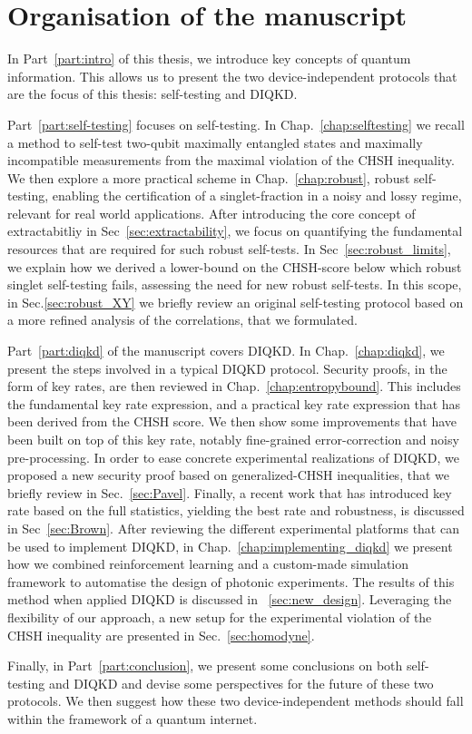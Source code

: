 \chapter{Organisation of the manuscript}

In Part~\ref{part:intro} of this thesis, we introduce key concepts of quantum information.
This allows us to present the two device-independent protocols that are the focus of this thesis: self-testing and \acrfull{DIQKD}.

\medbreak

Part~\ref{part:self-testing} focuses on self-testing.
In Chap.~\ref{chap:selftesting} we recall a method to self-test two-qubit maximally entangled states and maximally incompatible measurements from the maximal violation of the CHSH inequality.
We then explore a more practical scheme in Chap.~\ref{chap:robust}, robust self-testing, enabling the certification of a singlet-fraction in a noisy and lossy regime, relevant for real world applications.
After introducing the core concept of extractabitliy in Sec~\ref{sec:extractability}, we focus on quantifying the fundamental resources that are required for such robust self-tests.
In Sec~\ref{sec:robust_limits}, we explain how we derived a lower-bound on the CHSH-score below which robust singlet self-testing fails, assessing the need for new robust self-tests.
In this scope, in Sec.\ref{sec:robust_XY} we briefly review an original self-testing protocol based on a more refined analysis of the correlations, that we formulated. 
\medbreak

Part~\ref{part:diqkd} of the manuscript covers \acrfull{DIQKD}.
In Chap.~\ref{chap:diqkd}, we present the steps involved in a typical DIQKD protocol.
Security proofs, in the form of key rates, are then reviewed in Chap.~\ref{chap:entropybound}. 
This includes the fundamental key rate expression, and a practical key rate expression that has been derived from the CHSH score. 
We then show some improvements that have been built on top of this key rate, notably fine-grained error-correction and noisy pre-processing. 
In order to ease concrete experimental realizations of DIQKD, we proposed a new security proof based on generalized-CHSH inequalities, that we briefly review in Sec.~\ref{sec:Pavel}.
Finally, a recent work that has introduced key rate based on the full statistics, yielding the best rate and robustness, is discussed in Sec~\ref{sec:Brown}.
After reviewing the different experimental platforms that can be used to implement DIQKD, in Chap.~\ref{chap:implementing_diqkd} we present how we combined reinforcement learning and a custom-made simulation framework to automatise the design of photonic experiments.
The results of this method when applied DIQKD is discussed in ~\ref{sec:new_design}.
Leveraging the flexibility of our approach, a new setup for the experimental violation of the CHSH inequality are presented in Sec.~\ref{sec:homodyne}.

\medbreak
Finally, in Part~\ref{part:conclusion}, we present some conclusions on both self-testing and DIQKD and devise some perspectives for the future of these two protocols. 
We then suggest how these two device-independent methods should fall within the framework of a quantum internet.

